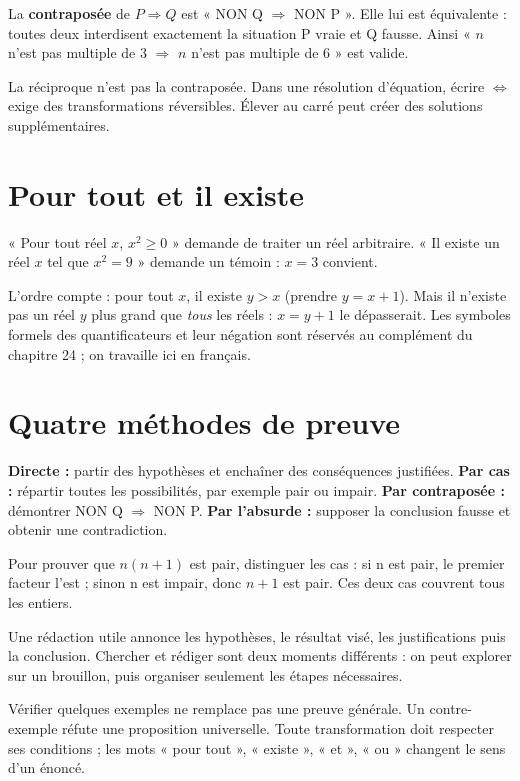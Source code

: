 \documentclass[../cours_2de.tex]{subfiles}
\begin{document}
La \textbf{contraposée} de $P\Rightarrow Q$ est « NON Q $\Rightarrow$ NON P ». Elle lui est équivalente : toutes deux interdisent exactement la situation P vraie et Q fausse. Ainsi « $n$ n'est pas multiple de $3$ $\Rightarrow$ $n$ n'est pas multiple de $6$ » est valide.
\begin{attention}
La réciproque n'est pas la contraposée. Dans une résolution d'équation, écrire $\Leftrightarrow$ exige des transformations réversibles. Élever au carré peut créer des solutions supplémentaires.
\end{attention}
\section{Pour tout et il existe}
« Pour tout réel $x$, $x^2\ge0$ » demande de traiter un réel arbitraire. « Il existe un réel $x$ tel que $x^2=9$ » demande un témoin : $x=3$ convient.

L'ordre compte : pour tout $x$, il existe $y>x$ (prendre $y=x+1$). Mais il n'existe pas un réel $y$ plus grand que \emph{tous} les réels : $x=y+1$ le dépasserait. Les symboles formels des quantificateurs et leur négation sont réservés au complément du chapitre 24 ; on travaille ici en français.
\section{Quatre méthodes de preuve}
\begin{methode}
\textbf{Directe :} partir des hypothèses et enchaîner des conséquences justifiées.
\textbf{Par cas :} répartir toutes les possibilités, par exemple pair ou impair.
\textbf{Par contraposée :} démontrer NON Q $\Rightarrow$ NON P.
\textbf{Par l'absurde :} supposer la conclusion fausse et obtenir une contradiction.
\end{methode}
Pour prouver que $n(n+1)$ est pair, distinguer les cas : si n est pair, le premier facteur l'est ; sinon n est impair, donc $n+1$ est pair. Ces deux cas couvrent tous les entiers.

Une rédaction utile annonce les hypothèses, le résultat visé, les justifications puis la conclusion. Chercher et rédiger sont deux moments différents : on peut explorer sur un brouillon, puis organiser seulement les étapes nécessaires.
\begin{retenir}
Vérifier quelques exemples ne remplace pas une preuve générale. Un contre-exemple réfute une proposition universelle. Toute transformation doit respecter ses conditions ; les mots « pour tout », « existe », « et », « ou » changent le sens d'un énoncé.
\end{retenir}
\end{document}
